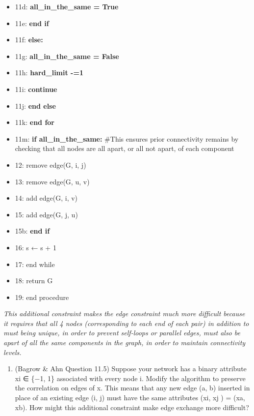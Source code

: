 \documentclass[11pt]{article}
\providecommand{\tightlist}{%
      \setlength{\itemsep}{0pt}\setlength{\parskip}{0pt}}
\begin{document}
\begin{itemize}
\item
  11d: \textbf{all\_in\_the\_same = True}
\item
  11e: \textbf{end if}
\item
  11f: \textbf{else:}
\item
  11g: \textbf{all\_in\_the\_same = False}
\item
  11h: \textbf{hard\_limit -=1}
\item
  11i: \textbf{continue}
\item
  11j: \textbf{end else}
\item
  11k: \textbf{end for}
\item
  11m: \textbf{if all\_in\_the\_same:} \#This ensures prior connectivity
  remains by checking that all nodes are all apart, or all not apart, of
  each component
\item
  12: remove edge(G, i, j)
\item
  13: remove edge(G, u, v)
\item
  14: add edge(G, i, v)
\item
  15: add edge(G, j, u)
\item
  15b: \textbf{end if}
\item
  16: s ← s + 1
\item
  17: end while
\item
  18: return G
\item
  19: end procedure
\end{itemize}

\emph{This additional constraint makes the edge constraint much more
difficult because it requires that all 4 nodes (corresponding to each
end of each pair) in addition to must being unique, in order to prevent
self-loops or parallel edges, must also be apart of all the same
components in the graph, in order to maintain connectivity levels.}

    \begin{enumerate}
\def\labelenumi{(\alph{enumi})}
\setcounter{enumi}{3}
\tightlist
\item
  (Bagrow \& Ahn Question 11.5) Suppose your network has a binary
  attribute xi ∈ \{−1, 1\} associated with every node i. Modify the
  algorithm to preserve the correlation on edges of x. This means that
  any new edge (a, b) inserted in place of an existing edge (i, j) must
  have the same attributes (xi, xj ) = (xa, xb). How might this
  additional constraint make edge exchange more difficult?
\end{enumerate}
\end{document}
